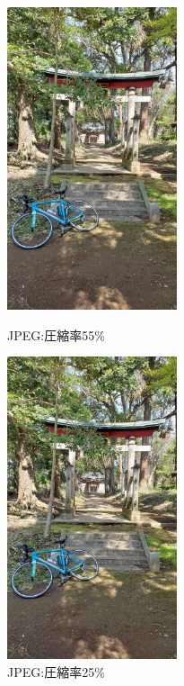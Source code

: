 \documentclass[a4paper,11pt]{bxjsarticle}
\begin{document}
   \begin{figure}[htbp]
    \begin{minipage}{0.5\hsize}
     \begin{center}
      \includegraphics[width=50mm]{sample_j55.jpg}
     \end{center}
     \caption{JPEG:圧縮率55\%}
     \label{fig:j55}
    \end{minipage}
    \begin{minipage}{0.5\hsize}
     \begin{center}
      \includegraphics[width=50mm]{sample_j25.jpg}
     \end{center}
     \caption{JPEG:圧縮率25\%}
     \label{fig:j25}
    \end{minipage}
   \end{figure}
\end{document}
